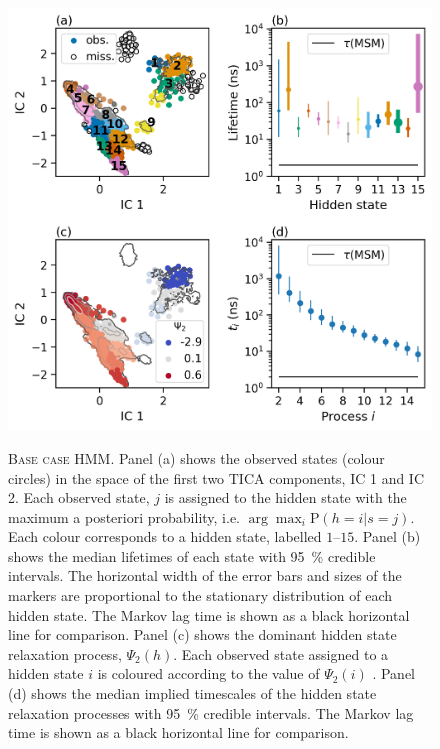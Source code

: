 \begin{figure}
    \centering
    \caption[Base case HMM]{\textsc{Base case HMM}. Panel (a) shows the observed states (colour circles) in the space of the first two TICA components, IC 1 and IC 2. Each observed state, $j$ is assigned to the hidden state with the maximum a posteriori probability, i.e.  $\arg \max_{i} \mathrm{P}(h=i|s=j)$. Each colour corresponds to a hidden state, labelled $\numrange[range-phrase=--]{1}{15}$. Panel (b) shows the median lifetimes of each state with \SI{95}{\percent} credible intervals. The horizontal width of the error bars and sizes of the markers are proportional to the stationary distribution of each hidden state. The Markov lag time is shown as a black horizontal line for comparison. Panel (c) shows the dominant hidden state relaxation process, $\Psi_{2}(h)$. Each observed state assigned to a hidden state $i$ is coloured according to the value of $\Psi_{2}(i)$ . Panel (d) shows the median implied timescales of the hidden state relaxation processes with \SI{95}{\percent} credible intervals. The Markov lag time is shown as a black horizontal line for comparison.}
    \includegraphics{chapters/aadh/figures/base_case_hmm.png}
    \label{fig:base_case_hmm}
\end{figure}

